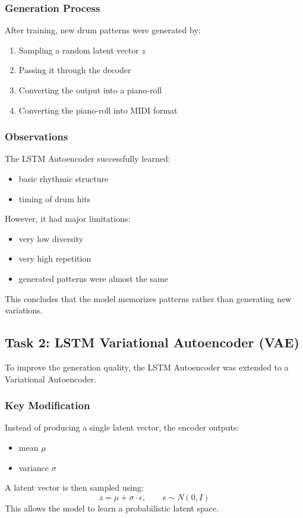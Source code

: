 \documentclass[conference]{IEEEtran}
\begin{document}
\subsubsection{Generation Process}
After training, new drum patterns were generated by:
\begin{enumerate}
    \item Sampling a random latent vector $z$
    \item Passing it through the decoder
    \item Converting the output into a piano-roll
    \item Converting the piano-roll into MIDI format
\end{enumerate}

\subsubsection{Observations}
The LSTM Autoencoder successfully learned:
\begin{itemize}
    \item basic rhythmic structure
    \item timing of drum hits
\end{itemize}
However, it had major limitations:
\begin{itemize}
    \item very low diversity
    \item very high repetition
    \item generated patterns were almost the same
\end{itemize}
This concludes that the model memorizes patterns rather than generating new variations.

\subsection{Task 2: LSTM Variational Autoencoder (VAE)}
To improve the generation quality, the LSTM Autoencoder was extended to a Variational Autoencoder.

\subsubsection{Key Modification}
Instead of producing a single latent vector, the encoder outputs:
\begin{itemize}
    \item mean $\mu$
    \item variance $\sigma$
\end{itemize}
A latent vector is then sampled using:
\[
z = \mu + \sigma \cdot \epsilon, \qquad \epsilon \sim N(0, I)
\]
This allows the model to learn a probabilistic latent space.
\end{document}
